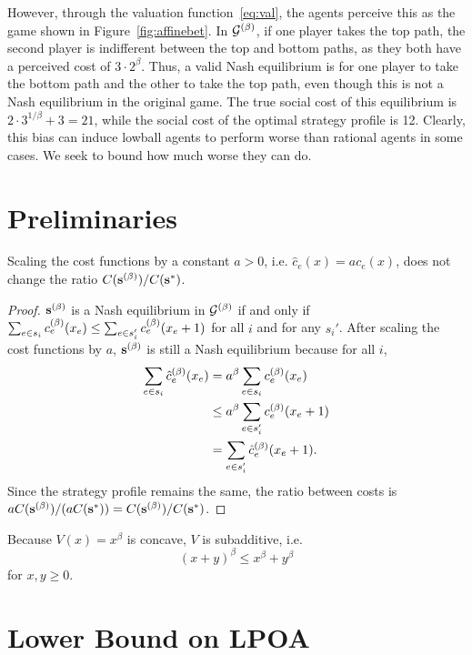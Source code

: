 \documentclass[twoside]{article}
\begin{document}
\begin{multicols}{2}
However, through the valuation function~\eqref{eq:val}, the agents perceive this
as the game shown in Figure~\ref{fig:affinebet}. In $\mathcal{G}\pbet$, if one
player takes the top path, the second player is indifferent between the top and
bottom paths, as they both have a perceived cost of $3 \cdot 2^\beta$. Thus, a
valid Nash equilibrium is for one player to take the bottom path and the other
to take the top path, even though this is not a Nash equilibrium in the original
game. The true social cost of this equilibrium is $2 \cdot 3^{1/\beta} + 3 =
21$, while the social cost of the optimal strategy profile is 12. Clearly, this
bias can induce lowball agents to perform worse than rational agents in some
cases. We seek to bound how much worse they can do.

\section{Preliminaries}
\begin{lem} \label{lem:scale}
  Scaling the cost functions by a constant $a > 0$, i.e. $\hat c_e(x) = a
  c_e(x)$, does not change the ratio $C(\s\pbet)/C(\s^*)$.
\end{lem}
\begin{proof}
  $\s\pbet$ is a Nash equilibrium in $\mathcal{G}\pbet$ if and only if $\sum_{e
  \in s_i} c_e\pbet(x_e) \le \sum_{e \in s_i'} c_e\pbet(x_e + 1)$ for all $i$
  and for any $s_i'$. After scaling the cost functions by $a$, $\s\pbet$ is
  still a Nash equilibrium because for all $i$,
  \begin{align*}
    \sum_{e \in s_i} \hat c_e\pbet(x_e) &= a^\beta \sum_{e \in s_i}
    c_e\pbet(x_e) \\
    &\le a^\beta \sum_{e \in s_i'} c_e\pbet(x_e + 1) \\
    &= \sum_{e \in s_i'} \hat c_e\pbet(x_e+1).
  \end{align*}
  Since the strategy profile remains the same, the ratio between costs is $a
  C(\s\pbet)/(a C(\s^*)) = C(\s\pbet)/C(\s^*)$.
\end{proof}

Because $V(x) = x^\beta$ is concave, $V$ is subadditive, i.e.
\begin{equation}
  (x+y)^\beta \le x^\beta + y^\beta
  \label{eq:subadditive}
\end{equation}
for $x,y \ge 0$.

\section{Lower Bound on LPOA} \label{sec:lb}
\begin{figure}[H]
  \centering
  \begin{subfigure}[b]{\linewidth}
    \centering
    \begin{tikzpicture} [baseline=(s.base), arc/.style={->,thick,>=stealth},
      vertex/.style={draw,circle,minimum size=.5cm},scale=1.5]


\end{tikzpicture}
\end{subfigure}
\end{figure}
\end{multicols}
\end{document}
